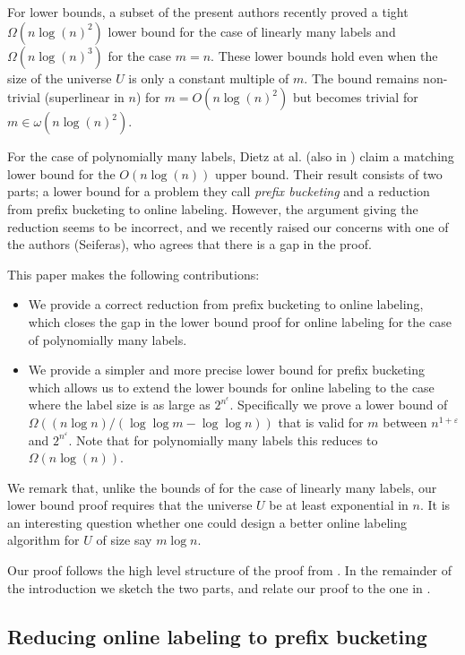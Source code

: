 \documentclass[runningheads,a4paper]{llncs}
\begin{document}
For lower bounds, a subset of the present authors 
recently proved \cite{BKS} a tight $\Omega(n \log(n)^2)$ lower bound for the case of linearly many labels and $\Omega(n \log(n)^3)$ for
the case $m=n$. These lower bounds hold even when the size of the universe $U$ is only a constant multiple of $m$.  The bound remains
non-trivial (superlinear in $n$) for $m  = O(n \log(n)^2)$ but
becomes trivial  for $m \in \omega(n \log(n)^2)$. 

For the case of polynomially many labels,
Dietz at al. \cite{DSZ04} (also in \cite{Zhang}) claim a matching lower bound for the $O(n \log(n))$ upper bound.
Their result consists of two parts; a lower bound for a problem they call {\em prefix bucketing}
and a reduction from  prefix bucketing to online labeling.  However, the argument giving the reduction seems to be incorrect, 
and we recently raised our concerns with one of the authors (Seiferas), who agrees that
there is a gap in the proof. 

This paper makes the following contributions:

\begin{itemize}
\item We provide a correct reduction from prefix bucketing to  online labeling, which closes the gap in the lower
bound proof for online labeling for the case of polynomially many labels.
\item We provide a simpler and more precise lower bound for prefix bucketing which allows us to extend the lower bounds
for online labeling to the case where the label size is as large as $2^{n^\epsilon}$.
Specifically we prove a lower bound of $\Omega((n \log n) / (\log \log m - \log \log n))$ that is valid
for $m$ between $n^{1+\varepsilon}$ and $2^{n^{\varepsilon}}$.   Note that for
polynomially many labels this reduces to $\Omega(n \log(n))$. 
\end{itemize}

We remark that, unlike the bounds of \cite{BKS} for the case of linearly many labels, our lower bound proof requires that the universe
$U$ be  at least exponential in $n$. It is an interesting question whether one could design
a better online labeling algorithm for $U$ of size say $m \log n$. 

Our proof follows the high level structure of the proof from \cite{DSZ04}.  In the remainder of the introduction we sketch the two
parts, and relate our proof to the one in \cite{DSZ04}.


\subsection{Reducing online labeling to prefix bucketing}
\end{document}
